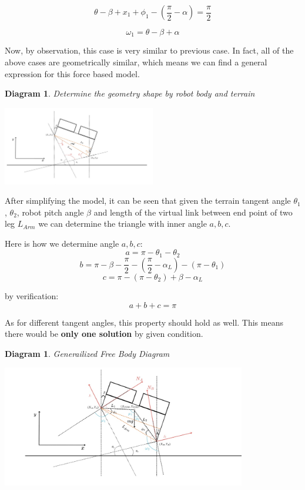 \documentclass[11pt]{article}
\newtheorem{diagram}[statement]{Diagram}
\begin{document}
\begin{equation}
\theta-\beta + x_1 + \phi_1 - \left( \frac{\pi}{2} - \alpha \right) = \frac{\pi}{2}
\end{equation}

\begin{equation}
\omega_1 = \theta - \beta + \alpha
\tag*{From (1) and (2)}
\end{equation}

Now, by observation, this case is very similar to previous case. In fact, all of the above cases
are geometrically similar, which means we can find a general expression for this force based model.

\begin{diagram}
    Determine the geometry shape by robot body and terrain
\end{diagram}
\vspace{1ex} %
\begin{center}
    \includegraphics[width=0.5\textwidth]{figs/geometry shape.jpg} %
\end{center}

After simplifying the model, it can be seen that given the terrain tangent angle \(\theta_1\), \(\theta_2\), robot pitch
angle \(\beta\) and length of the virtual link between end point of two leg \(L_{Arm}\) we can determine the triangle with
inner angle \(a,b,c\). 

Here is how we determine angle \(a, b, c\):
\[a = \pi - \theta_1 - \theta_2\]
\[b = \pi - \beta - \frac{\pi}{2}-(\frac{\pi}{2}-\alpha_L)-(\pi-\theta_1)\]
\[c = \pi - (\pi-\theta_2) + \beta - \alpha_L\]

by verification: 
\[a+b+c = \pi\]

As for different tangent angles, this property should hold as well. This means there would be \textbf{only one solution} by
given condition.

\begin{diagram}
    Generailized Free Body Diagram
\end{diagram}
\vspace{1ex} %
\begin{center}
    \includegraphics[width=0.8\textwidth]{figs/Generailized.jpg} %
\end{center}
\end{document}
